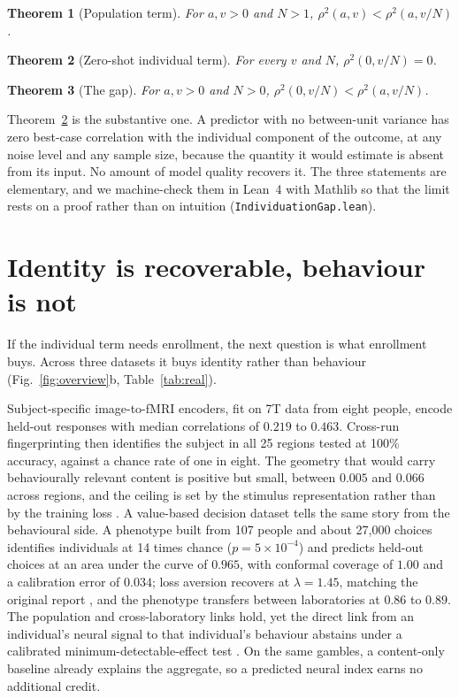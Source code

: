 \documentclass[11pt]{article}
\newtheorem{theorem}{Theorem}
\begin{document}
\begin{theorem}[Population term]\label{thm:agg}
For $a,v>0$ and $N>1$, $\rho^2(a,v)<\rho^2(a,v/N)$.
\end{theorem}
\begin{theorem}[Zero-shot individual term]\label{thm:zero}
For every $v$ and $N$, $\rho^2(0,v/N)=0$.
\end{theorem}
\begin{theorem}[The gap]\label{thm:gap}
For $a,v>0$ and $N>0$, $\rho^2(0,v/N)<\rho^2(a,v/N)$.
\end{theorem}

Theorem~\ref{thm:zero} is the substantive one. A predictor with no between-unit variance has zero best-case
correlation with the individual component of the outcome, at any noise level and any sample size, because
the quantity it would estimate is absent from its input. No amount of model quality recovers it. The three
statements are elementary, and we machine-check them in Lean~4 with Mathlib so that the limit rests on a
proof rather than on intuition (\texttt{IndividuationGap.lean}).

\section*{Identity is recoverable, behaviour is not}
If the individual term needs enrollment, the next question is what enrollment buys. Across three datasets it
buys identity rather than behaviour (Fig.~\ref{fig:overview}b, Table~\ref{tab:real}).

Subject-specific image-to-fMRI encoders, fit on 7T data from eight people, encode held-out responses with
median correlations of $0.219$ to $0.463$. Cross-run fingerprinting then identifies the subject in all 25
regions tested at 100\% accuracy, against a chance rate of one in eight. The geometry that would carry
behaviourally relevant content is positive but small, between $0.005$ and $0.066$ across regions, and the
ceiling is set by the stimulus representation rather than by the training loss \citep{allen2022,chang2019}.
A value-based decision dataset tells the same story from the behavioural side. A phenotype built from 107
people and about 27{,}000 choices identifies individuals at 14 times chance ($p=5\times10^{-4}$) and predicts
held-out choices at an area under the curve of $0.965$, with conformal coverage of $1.00$ and a calibration
error of $0.034$; loss aversion recovers at $\lambda=1.45$, matching the original report \citep{tom2007}, and
the phenotype transfers between laboratories at $0.86$ to $0.89$. The population and cross-laboratory links
hold, yet the direct link from an individual's neural signal to that individual's behaviour abstains under a
calibrated minimum-detectable-effect test \citep{botviniknezer2019}. On the same gambles, a content-only
baseline already explains the aggregate, so a predicted neural index earns no additional credit.
\end{document}
